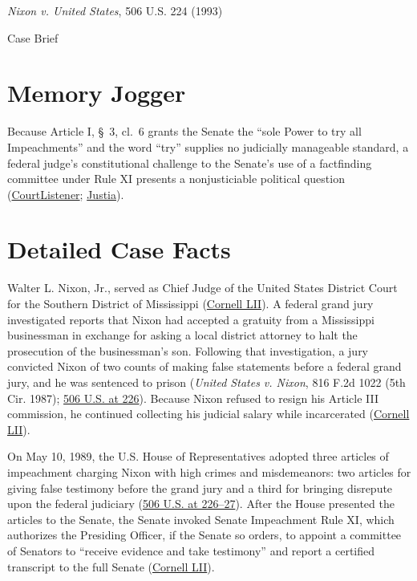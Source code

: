 \documentclass[12pt]{article}
\begin{document}
\begin{center}
{\LARGE \textit{Nixon v. United States}, 506 U.S. 224 (1993)\par}
\vspace{0.8em}
{\large Case Brief\par}
\end{center}
\vspace{1em}

\section{Memory Jogger}

Because Article I, \S~3, cl.\ 6 grants the Senate the ``sole Power to try all Impeachments'' and the word ``try'' supplies no judicially manageable standard, a federal judge's constitutional challenge to the Senate's use of a factfinding committee under Rule XI presents a nonjusticiable political question (\href{https://www.courtlistener.com/opinion/112803/nixon-v-united-states/}{CourtListener}; \href{https://supreme.justia.com/cases/federal/us/506/224/}{Justia}).

\section{Detailed Case Facts}

Walter L. Nixon, Jr., served as Chief Judge of the United States District Court for the Southern District of Mississippi (\href{https://www.law.cornell.edu/supct/html/91-740.ZO.html}{Cornell LII}). A federal grand jury investigated reports that Nixon had accepted a gratuity from a Mississippi businessman in exchange for asking a local district attorney to halt the prosecution of the businessman's son. Following that investigation, a jury convicted Nixon of two counts of making false statements before a federal grand jury, and he was sentenced to prison (\textit{United States v. Nixon}, 816 F.2d 1022 (5th Cir. 1987); \href{https://supreme.justia.com/cases/federal/us/506/224/}{506 U.S. at 226}). Because Nixon refused to resign his Article III commission, he continued collecting his judicial salary while incarcerated (\href{https://www.law.cornell.edu/supct/html/91-740.ZO.html}{Cornell LII}).

On May 10, 1989, the U.S. House of Representatives adopted three articles of impeachment charging Nixon with high crimes and misdemeanors: two articles for giving false testimony before the grand jury and a third for bringing disrepute upon the federal judiciary (\href{https://supreme.justia.com/cases/federal/us/506/224/}{506 U.S. at 226--27}). After the House presented the articles to the Senate, the Senate invoked Senate Impeachment Rule XI, which authorizes the Presiding Officer, if the Senate so orders, to appoint a committee of Senators to ``receive evidence and take testimony'' and report a certified transcript to the full Senate (\href{https://www.law.cornell.edu/supct/html/91-740.ZO.html}{Cornell LII}).
\end{document}
